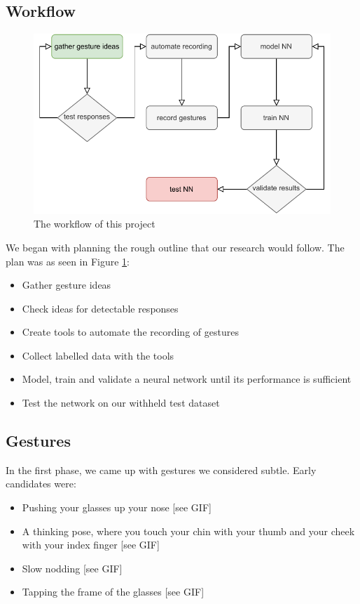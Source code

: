 \documentclass[runningheads]{llncs}
\begin{document}
\subsection{Workflow}
\begin{figure}
\centering
\centerline{\includegraphics[scale=0.8]{workflow.pdf}}
\caption{The workflow of this project}
\label{fig:workflow}
\end{figure}

We began with planning the rough outline that our research would follow.
The plan was as seen in Figure \ref{fig:workflow}:
\begin{itemize}
    \item Gather gesture ideas
    \item Check ideas for detectable responses
    \item Create tools to automate the recording of gestures
    \item Collect labelled data with the tools
    \item Model, train and validate a neural network until its performance is sufficient
    \item Test the network on our withheld test dataset
\end{itemize}

\subsection{Gestures}
In the first phase, we came up with gestures we considered subtle. Early candidates were:
\begin{itemize}
    \item Pushing your glasses up your nose [see GIF]
    \item A thinking pose, where you touch your chin with your thumb and your cheek with your
        index finger [see GIF]
    \item Slow nodding [see GIF]
    \item Tapping the frame of the glasses [see GIF]
\end{itemize}
\end{document}
